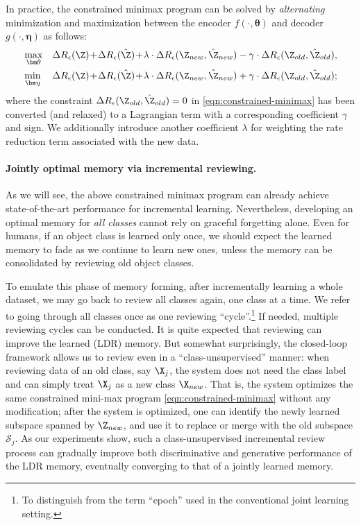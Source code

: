 \documentclass[../../book-main.tex]{subfiles}
\begin{document}
In practice, the constrained minimax program can be solved by {\em
alternating} minimization and maximization between the encoder
$f(\cdot, \bm \theta)$ and decoder $g(\cdot, \bm \eta)$ as follows:
\begin{eqnarray}
    &\max_{\bm \theta}
    &\Delta{R_\epsilon(\Z)}\!+\!\Delta{R_\epsilon(\hat{\Z})}\!+\!\lambda\cdot
    \Delta{R_\epsilon(\Z_{new},\hat{\Z}_{new})} - \gamma\cdot
    \Delta{R_\epsilon(\Z_{old},\hat{\Z}_{old})}, \label{eqn:relaxed-max}\\
    &\min_{\bm \eta}
    &\Delta{R_\epsilon(\Z)}\!+\!\Delta{R_\epsilon(\hat{\Z})}\!+\!\lambda\cdot
    \Delta{R_\epsilon(\Z_{new},\hat{\Z}_{new})} + \gamma\cdot
    \Delta{R_\epsilon(\Z_{old},\hat{\Z}_{old})}; \label{eqn:relaxed-min}
\end{eqnarray}
where the constraint $\Delta R_\epsilon(\Z_{old},\hat{\Z}_{old}) = 0$
in \eqref{eqn:constrained-minimax} has been converted (and relaxed)
to a Lagrangian term with a corresponding coefficient $\gamma$ and
sign. We additionally introduce another coefficient $\lambda$ for
weighting the rate reduction term associated with the new data.

\paragraph{Jointly optimal memory via incremental reviewing.}
As we will see, the above constrained minimax program can already
achieve state-of-the-art performance for incremental learning.
Nevertheless, developing an optimal memory for {\em all classes}
cannot rely on graceful forgetting alone. Even for humans, if an
object class is learned only once, we should expect the learned
memory to fade as we continue to learn new ones, unless the memory
can be consolidated by reviewing old object classes. %

To emulate this phase of memory forming, after incrementally learning
a whole dataset, we may go back to review all classes again, one
class at a time. We refer to going through all classes once as one
reviewing ``cycle''.\footnote{To distinguish from the term ``epoch''
used in the conventional joint learning setting.} If needed, multiple
reviewing cycles can be conducted. It is quite expected that
reviewing can improve the learned (LDR) memory. But somewhat
surprisingly, the closed-loop framework allows us to review even in a
``{class-unsupervised}'' manner: when reviewing data of an old class,
say $\X_j$, the system does not need the class label and can simply
treat $\X_j$ as a new class $\X_{new}$. That is, the system optimizes
the same constrained mini-max program \eqref{eqn:constrained-minimax}
without any modification; after the system is optimized, one can
identify the newly learned subspace spanned by $\Z_{new}$, and use it
to replace or merge with the old subspace $\mathcal{S}_j$. As our
experiments show, such a class-unsupervised incremental review
process can gradually improve both discriminative and generative
performance of the LDR memory, eventually converging to that of a
jointly learned memory.
\end{document}
